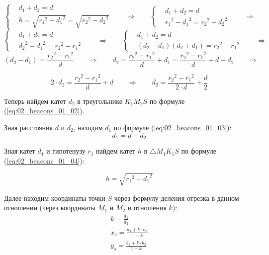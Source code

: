 \[
\left\{ 
	\begin{aligned}
		& d_1 + d_2 = d \\
		& h = \sqrt{{r_1}^2 - {d_1}^2} = \sqrt{{r_2}^2 - {d_2}^2}
	\end{aligned}
	\right.
	\qquad \Rightarrow \qquad
	\left\{ 
	\begin{aligned}
		& d_1 + d_2 = d \\
		& {r_1}^2 - {d_1}^2 = {r_2}^2 - {d_2}^2
	\end{aligned}
\right.
\qquad	\Rightarrow
\]
\[
	\left\{ 
		\begin{aligned}
			& d_1 + d_2 = d \\
			& {d_2}^2 - {d_1}^2 = {r_2}^2 - {r_1}^2
		\end{aligned}
		\right.
		\qquad \Rightarrow \qquad
		\left\{ 
		\begin{aligned}
			& d_1 + d_2 = d \\
			& (d_2 - d_1)(d_2 + d_1) = {r_2}^2 - {r_1}^2
		\end{aligned}
	\right.
	\qquad \Rightarrow
\]
\[
	(d_2 - d_1) = \frac{{r_2}^2 - {r_1}^2}{d} \qquad \Rightarrow \qquad
	d_2 = \frac{{r_2}^2 - {r_1}^2}{d} + d_1 = \frac{{r_2}^2 - {r_1}^2}{d} + d - d_2 \qquad \Rightarrow
\]

\begin{equation}
	2\cdot d_2 = \frac{{r_2}^2 - {r_1}^2}{d} + d \qquad \Rightarrow \qquad 
	d_2 = \frac {{r_2}^2 - {r_1}^2}{2\cdot d} + \frac{d}{2}
	\label{eq:02_beacons_01_02}
\end{equation}

Теперь найдем катет $d_2$ в треугольнике $K_1M_2S$ по формуле (\ref{eq:02_beacons_01_02}).

Зная расстояния $d$ и $d_2$, находим $d_1$ по формуле (\ref{eq:02_beacons_01_03}):
\begin{equation}
	d_1 = d - d_2
	\label{eq:02_beacons_01_03}
\end{equation}

Зная катет $d_1$ и гипотенузу $r_1$ найдем катет $h$ в $\triangle M_1K_1S$ по формуле (\ref{eq:02_beacons_01_04}):

\begin{equation}
	h = \sqrt{{r_1}^2 - {d_1}^2}
	\label{eq:02_beacons_01_04}
\end{equation}

Далее находим координаты точки $S$ через формулу деления отрезка в данном отношении (через координаты $M_1$ и $M_2$ и отношения $k$):
\begin{eqnarray}
		k = \frac{d_1}{d_2} \nonumber \\
		x_s = \frac{a_1 + k \cdot a_2}{1 + k} \label{eq:02_beacons_01_05} \\
		y_s = \frac{b_1 + k \cdot b_2}{1 + k} \label{eq:02_beacons_01_06}
\end{eqnarray}

